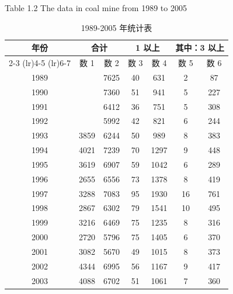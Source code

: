 \begin{table}[H]
    \centering
    \caption{1989-2005 年统计表}
    \label{tab:stats}
    \centerline{Table 1.2 The data in coal mine from 1989 to 2005}
    \begin{tabular*}{\textwidth}{@{\extracolsep{\fill}}ccccccc}
        \toprule
        \multirow{2}{*}{年份} & \multicolumn{2}{c}{合计} & \multicolumn{2}{c}{1 以上} & \multicolumn{2}{c}{其中：3 以上} \\
        \cmidrule(lr){2-3} \cmidrule(lr){4-5} \cmidrule(lr){6-7}
        & 数 1 & 数 2 & 数 3 & 数 4 & 数 5 & 数 6 \\
        \midrule
        1989 &      & 7625 & 40 & 631  & 2  & 87  \\
        1990 &      & 7360 & 51 & 941  & 5  & 227 \\
        1991 &      & 6412 & 36 & 751  & 5  & 308 \\
        1992 &      & 5992 & 42 & 821  & 6  & 244 \\
        1993 & 3859 & 6244 & 50 & 989  & 8  & 383 \\
        1994 & 4021 & 7239 & 70 & 1297 & 9  & 448 \\
        1995 & 3619 & 6907 & 59 & 1042 & 6  & 289 \\
        1996 & 2655 & 6556 & 73 & 1378 & 8  & 419 \\
        1997 & 3288 & 7083 & 95 & 1930 & 16 & 761 \\
        1998 & 2867 & 6302 & 79 & 1541 & 10 & 495 \\
        1999 & 3216 & 6469 & 75 & 1235 & 8  & 316 \\
        2000 & 2720 & 5796 & 75 & 1405 & 6  & 370 \\
        2001 & 3082 & 5670 & 49 & 1015 & 8  & 373 \\
        2002 & 4344 & 6995 & 56 & 1167 & 9  & 417 \\
        2003 & 4088 & 6702 & 51 & 1061 & 7  & 360 \\
        \bottomrule
    \end{tabular*}
\end{table}

\begin{center}
    \makebox[0.85\textwidth]{\dotfill} \\
    \makebox[0.85\textwidth]{\dotfill} \\
    \makebox[0.85\textwidth]{\dotfill} \\
    \makebox[0.85\textwidth]{\dotfill} \\
    \makebox[0.85\textwidth]{\dotfill} \\
    \makebox[0.85\textwidth]{\dotfill} \\
    \makebox[0.85\textwidth]{\dotfill} \\
    \makebox[0.85\textwidth]{\dotfill} \\
    \makebox[0.85\textwidth]{\dotfill} \\
    \makebox[0.85\textwidth]{\dotfill}
\end{center}

